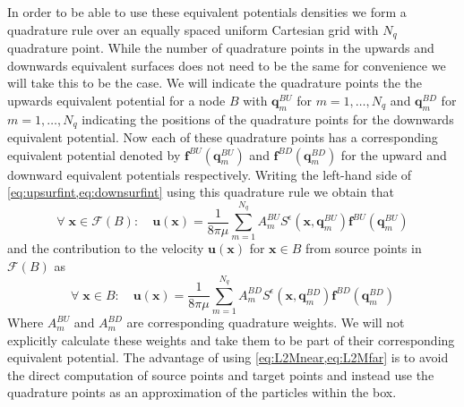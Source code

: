In order to be able to use these equivalent potentials densities we form a quadrature rule over an equally spaced uniform Cartesian grid with $N_q$ quadrature point. While the number of quadrature points in the upwards and downwards equivalent surfaces does not need to be the same for convenience we will take this to be the case. We will indicate the quadrature points the the upwards equivalent potential for a node $B$ with $\mathbf{q}^{BU}_m$ for $m=1,\dots,N_q$ and $\mathbf{q}^{BD}_m$ for $m=1,\dots,N_q$ indicating the positions of the quadrature points for the downwards equivalent potential. Now each of these quadrature points has a corresponding equivalent potential denoted by $\mathbf{f}^{BU}(\mathbf{q}^{BU}_m)$ and $\mathbf{f}^{BD}(\mathbf{q}^{BD}_m)$ for the upward and downward equivalent potentials respectively. Writing the left-hand side of \cref{eq:upsurfint,eq:downsurfint} using this quadrature rule we obtain that
\begin{equation}
\label{eq:L2Mfar}
    \forall \;\mathbf{x} \in \mathcal{F}(B): \quad \mathbf{u}(\mathbf{x})= \frac{1}{8 \pi \mu} \sum_{m=1}^{N_{q}} A_{m}^{BU} S^\epsilon\left(\mathbf{x}, \mathbf{q}_{m}^{B U}\right) \mathbf{f}^{B U}\left(\mathbf{q}_{m}^{B U}\right)
\end{equation}
and the contribution to the velocity $\mathbf{u}(\mathbf{x})$ for $\mathbf{x} \in B$ from source points in $\mathcal{F}(B)$ as
\begin{equation}
\label{eq:L2Mnear}
    \forall \;\mathbf{x} \in B: \quad \mathbf{u}(\mathbf{x})= \frac{1}{8 \pi \mu} \sum_{m=1}^{N_{q}} A_{m}^{BD} S^\epsilon\left(\mathbf{x}, \mathbf{q}_{m}^{B D}\right) \mathbf{f}^{B D}\left(\mathbf{q}_{m}^{B D}\right)
\end{equation}
Where $A_{m}^{BU}$ and $A_{m}^{BD}$ are corresponding quadrature weights. We will not explicitly calculate these weights and take them to be part of their corresponding equivalent potential. The advantage of using \cref{eq:L2Mnear,eq:L2Mfar} is to avoid the direct computation of source points and target points and instead use the quadrature points as an approximation of the particles within the box.

